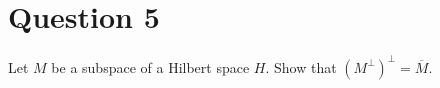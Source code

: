 \section{Question 5}

\horz

Let $M$ be a subspace of a Hilbert space $H$. Show that $(M^{\perp})^{\perp}= \overline{M}.$

\horz
